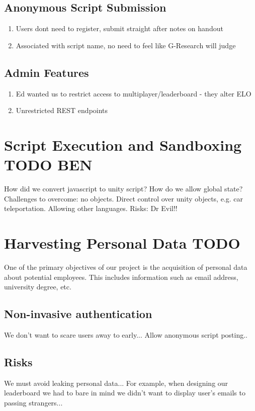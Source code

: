 \subsection{Anonymous Script Submission}

\begin{enumerate}
\item Users dont need to register, submit straight after notes on handout
\item Associated with script name, no need to feel like G-Research will judge 
\end{enumerate}

\subsection{Admin Features}

\begin{enumerate}
\item Ed wanted us to restrict access to multiplayer/leaderboard - they alter ELO
\item Unrestricted REST endpoints
\end{enumerate}

\section{Script Execution and Sandboxing TODO {\color{green} BEN}}
How did we convert javascript to unity script?
How do we allow global state?
Challenges to overcome: no objects. Direct control over unity objects, e.g. car teleportation. Allowing other languages.
Risks: Dr Evil!!

\section{Harvesting Personal Data TODO}
One of the primary objectives of our project is the acquisition of personal data about potential employees. This includes information such as email address, university degree, etc.
\subsection{Non-invasive authentication}
We don't want to scare users away to early...
Allow anonymous script posting..
\subsection{Risks}
We must avoid leaking personal data...
For example, when designing our leaderboard we had to bare in mind we didn't want to display user's emails to passing strangers...


